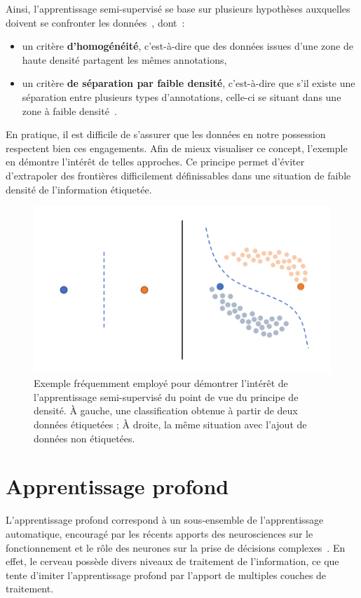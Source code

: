 Ainsi, l'apprentissage semi-supervisé se base sur plusieurs hypothèses auxquelles doivent se confronter les données~\cite{Zhu2009}, dont~:
\begin{itemize}
	\item un critère \textbf{d'homogénéité}, c’est-à-dire que des données issues d'une zone de haute densité partagent les mêmes annotations, 
	\item un critère \textbf{de séparation par faible densité}, c’est-à-dire que s'il existe une  séparation entre plusieurs types d'annotations, celle-ci se situant dans une zone à faible densité~\cite{chapelle2005}.
\end{itemize}
En pratique, il est difficile de s'assurer que les données en notre possession respectent bien ces engagements. Afin de mieux visualiser ce concept, l'exemple en  démontre l'intérêt de telles approches. Ce principe permet d'éviter d'extrapoler des frontières difficilement définissables dans une situation de faible densité de l'information étiquetée.\par
 
\begin{figure}[H]
    \centering
    \includegraphics[width=\linewidth]{contents/chapter_3/resources/example_semi_supervised.pdf}
    \caption{Exemple fréquemment employé pour démontrer l'intérêt de l'apprentissage semi-supervisé du point de vue du principe de densité. À gauche, une classification obtenue à partir de deux données étiquetées ; À droite, la même situation avec l’ajout de données non étiquetées.}
    \label{fig:example_semi_supervised}
\end{figure}

\clearpage

\section{Apprentissage profond}
\label{sec:deep_learning}
L’apprentissage profond correspond à un sous-ensemble de l’apprentissage automatique, encouragé par les récents apports des neurosciences sur le fonctionnement et le rôle des neurones sur la prise de décisions complexes~\cite{Quartz1997,Shrager1996}. En effet, le cerveau possède divers niveaux de traitement de l’information, ce que tente d'imiter l'apprentissage profond par l'apport de multiples couches de traitement.\par


